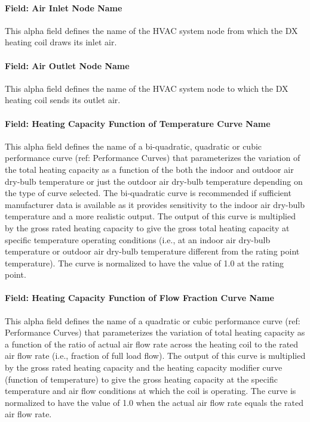 \paragraph{Field: Air Inlet Node Name}\label{field-air-inlet-node-name-13}

This alpha field defines the name of the HVAC system node from which the DX heating coil draws its inlet air.

\paragraph{Field: Air Outlet Node Name}\label{field-air-outlet-node-name-13}

This alpha field defines the name of the HVAC system node to which the DX heating coil sends its outlet air.

\paragraph{Field: Heating Capacity Function of Temperature Curve Name}\label{field-heating-capacity-function-of-temperature-curve-name}

This alpha field defines the name of a bi-quadratic, quadratic or cubic performance curve (ref: Performance Curves) that parameterizes the variation of the total heating capacity as a function of the both the indoor and outdoor air dry-bulb temperature or just the outdoor air dry-bulb temperature depending on the type of curve selected. The bi-quadratic curve is recommended if sufficient manufacturer data is available as it provides sensitivity to the indoor air dry-bulb temperature and a more realistic output. The output of this curve is multiplied by the gross rated heating capacity to give the gross total heating capacity at specific temperature operating conditions (i.e., at an indoor air dry-bulb temperature or outdoor air dry-bulb temperature different from the rating point temperature). The curve is normalized to have the value of 1.0 at the rating point.

\paragraph{Field: Heating Capacity Function of Flow Fraction Curve Name}\label{field-heating-capacity-function-of-flow-fraction-curve-name}

This alpha field defines the name of a quadratic or cubic performance curve (ref: Performance Curves) that parameterizes the variation of total heating capacity as a function of the ratio of actual air flow rate across the heating coil to the rated air flow rate (i.e., fraction of full load flow). The output of this curve is multiplied by the gross rated heating capacity and the heating capacity modifier curve (function of temperature) to give the gross heating capacity at the specific temperature and air flow conditions at which the coil is operating. The curve is normalized to have the value of 1.0 when the actual air flow rate equals the rated air flow rate.

